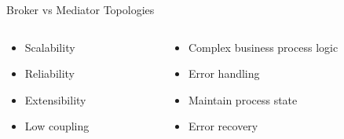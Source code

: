 \documentclass{slide}
\begin{document}
\begin{frame}{Broker vs Mediator Topologies}
    \vspace{1mm}
    \begin{columns}[t]
    \begin{column}{0.41\textwidth}
    {\LARGE
    \begin{itemize}
        \item Scalability
        \item Reliability
        \item Extensibility
        \item Low coupling
    \end{itemize}
    }
    \end{column}
    \begin{column}{0.59\textwidth}
    {\LARGE
    \begin{itemize}
        \item Complex business process logic
        \item Error handling
        \item Maintain process state
        \item Error recovery
    \end{itemize}
    }
    \end{column}
    \end{columns}
\end{frame}
\end{document}

